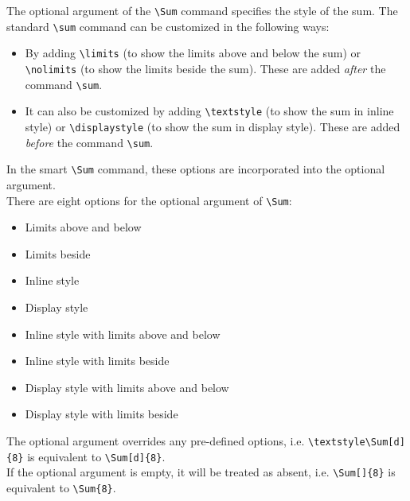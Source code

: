 \documentclass[10pt]{extarticle}
\newcommand{\<}{\langle}
\renewcommand{\>}{\rangle}
\theoremstyle{mystyle}{\newtheorem*{remark}{Remark}}
\theoremstyle{mystyle}{\newtheorem*{remarks}{Remarks}}
\theoremstyle{mystyle}{\newtheorem*{example}{Example}}
\theoremstyle{mystyle}{\newtheorem*{examples}{Examples}}
\theoremstyle{definition}{\newtheorem*{exercise}{Exercise}}
\theoremstyle{warn}
\begin{document}
The optional argument of the \verb!\Sum! command specifies the style of the sum. The standard \verb!\sum! command can be customized in the following ways:
\begin{itemize}
    \item By adding \verb!\limits! (to show the limits above and below the sum) or \verb!\nolimits! (to show the limits beside the sum). These are added \emph{after} the command \verb!\sum!.
    \item It can also be customized by adding \verb!\textstyle! (to show the sum in inline style) or \verb!\displaystyle! (to show the sum in display style). These are added \emph{before} the command \verb!\sum!.
\end{itemize}
In the smart \verb!\Sum! command, these options are incorporated into the optional argument.\\

There are eight options for the optional argument of \verb!\Sum!:
\vspace*{-10pt}
\begin{multicols}{2}
\begin{itemize}[leftmargin=0.5in,labelsep=0.3in]
    \item[\texttt{l}] Limits above and below
    \item[\texttt{n}] Limits beside
    \item[\texttt{i}] Inline style
    \item[\texttt{d}] Display style
    \item[\texttt{il}] Inline style with limits above and below
    \item[\texttt{in}] Inline style with limits beside
    \item[\texttt{dl}] Display style with limits above and below
    \item[\texttt{dn}] Display style with limits beside
\end{itemize}
\end{multicols}

The optional argument overrides any pre-defined options, i.e. \verb!\textstyle\Sum[d]{8}! is equivalent to \verb!\Sum[d]{8}!.\\

If the optional argument is empty, it will be treated as absent, i.e. \verb!\Sum[]{8}! is equivalent to \verb!\Sum{8}!.
\end{document}

